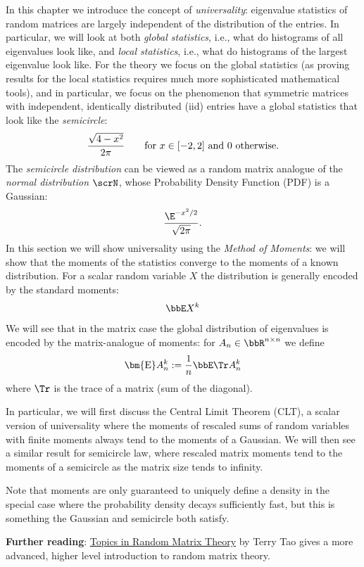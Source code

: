 In this chapter we introduce the concept of \emph{universality}: eigenvalue statistics of random matrices are largely independent of the distribution of the entries. In particular, we will look at both \emph{global statistics}, i.e., what do histograms of all eigenvalues look like, and \emph{local statistics}, i.e., what do histograms of the largest eigenvalue look like. For the theory we focus on the global statistics (as proving results for the local statistics requires much more sophisticated  mathematical tools), and in particular, we focus on the phenomenon that symmetric matrices with independent, identically distributed (iid) entries have a global statistics that look like the \emph{semicircle}:
\[
{\sqrt{4-x^2} \over 2\ensuremath{\pi}} \qquad \text{for } x \in [-2, 2] \text{ and } 0 \text{ otherwise.}
\]
The \emph{semicircle distribution} can be viewed as a random matrix analogue of  the \emph{normal distribution} $\ensuremath{\scrN}$, whose Probability Density Function (PDF) is a Gaussian:
\[
{\E^{-x^2/2} \over \sqrt{2\ensuremath{\pi}}}.
\]
In this section we will show universality using the \emph{Method of Moments}: we will show that the moments of the statistics converge to the moments of a known distribution. For a scalar random variable $X$ the distribution is generally encoded by the standard moments:
\[
\ensuremath{\bbE} X^k
\]
We will see that in the matrix case the global distribution of eigenvalues is encoded by the matrix-analogue of moments: for $A_n \ensuremath{\in} \ensuremath{\bbR}^{n \ensuremath{\times} n}$ we define
\[
\ensuremath{\bm{\mathrm{E}}} A_n^k := {1 \over n} \ensuremath{\bbE} \Tr A_n^k
\]
where $\Tr$ is the trace of a matrix (sum of the diagonal). 

In particular, we will first discuss the Central Limit Theorem (CLT), a scalar version of universality where the moments of rescaled sums of random variables with finite moments always tend to the moments of a Gaussian. We will then see a similar result for semicircle law, where rescaled matrix moments tend to the moments of a semicircle as the matrix size tends to infinity.

Note that moments are only guaranteed to uniquely define a density in the special case where the probability density decays sufficiently fast, but this is something the Gaussian and semicircle both satisfy.

\textbf{Further reading}: \href{https://terrytao.wordpress.com/wp-content/uploads/2011/02/matrix-book.pdf}{Topics in Random Matrix Theory} by Terry Tao gives a more advanced, higher level introduction to random matrix theory.

